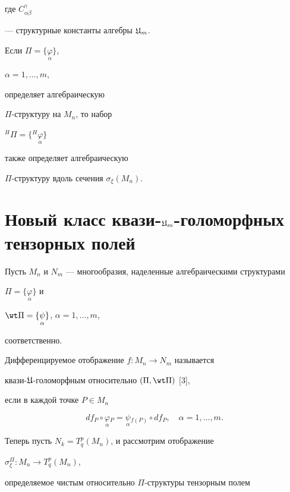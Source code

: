 где $C_{\alpha\beta}^\gamma$


--- структурные константы алгебры ${\frak U}_m$.





\begin{thm}


Если $\Pi = \{ \underset{\alpha}{\varphi} \}$,


$\alpha=1,\dotsc,m$,


определяет алгебраическую 


$\Pi$-структуру на $M_n$, то набор


${}^H \Pi = \{ {}^H \underset{\alpha}{\varphi} \}$


также определяет алгебраическую


$\Pi$-структуру вдоль сечения $\sigma_\xi(M_n)$.


\end{thm}


 


\section{Новый класс квази-${\frak U}_m$-голоморфных тензорных полей}





Пусть $M_n$ и $N_m$ --- многообразия, наделенные алгебраическими структурами


$\Pi = \{ \underset{\alpha}{\varphi} \}$ и


$\wt \Pi = \{ \underset{\alpha}{\psi} \}$, $\alpha=1,\dotsc,m$,


соответственно. 


Дифференцируемое отображение $f : M_n \to N_m$ называется 


квази-${\frak U}$-голоморфным относительно $(\Pi, \wt \Pi)$ [3], 


если в каждой точке $P \in M_n$


$$


df_P \circ \underset{\alpha}{\varphi}{}_P =


\underset{\alpha}{\psi}{}_{f(P)} \circ df_P,


\quad \alpha = 1, \dotsc, m.


$$


Теперь пусть $N_k = T^p_q(M_n)$, и рассмотрим отображение 


$\sigma^\Pi_\xi : M_n \to T^p_q(M_n)$,


определяемое чистым относительно $\Pi$-структуры тензорным полем 


